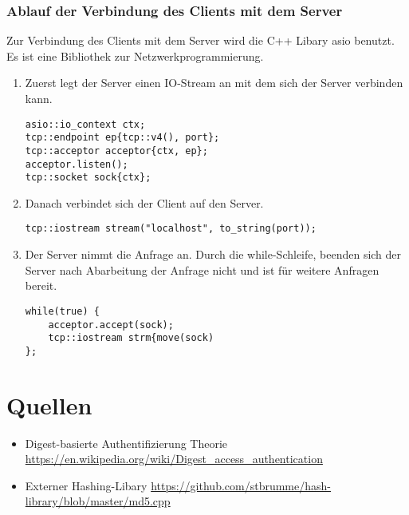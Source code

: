 \documentclass[12pt]{report}
\begin{document}
\subsection{Ablauf der Verbindung des Clients mit dem Server}
Zur Verbindung des Clients mit dem Server wird die C++ Libary asio benutzt. Es ist eine Bibliothek zur Netzwerkprogrammierung.
\begin{enumerate}
    \item Zuerst legt der Server einen IO-Stream an mit dem sich der Server verbinden kann.
    \begin{verbatim}
asio::io_context ctx;
tcp::endpoint ep{tcp::v4(), port};
tcp::acceptor acceptor{ctx, ep}; 
acceptor.listen();
tcp::socket sock{ctx};
    \end{verbatim}
    \item Danach verbindet sich der Client auf den Server.
    \begin{verbatim}
tcp::iostream stream("localhost", to_string(port));
    \end{verbatim}
    \item Der Server nimmt die Anfrage an. Durch die while-Schleife, beenden sich der Server nach Abarbeitung der Anfrage nicht und ist für weitere Anfragen bereit.
    \begin{verbatim}
while(true) {
    acceptor.accept(sock);
    tcp::iostream strm{move(sock)
};
    \end{verbatim}
\end{enumerate}
\newpage
\chapter{Quellen}
\begin{itemize}
    \item Digest-basierte Authentifizierung Theorie 
    \url{https://en.wikipedia.org/wiki/Digest\_access\_authentication}
    \item Externer Hashing-Libary 
    \url{https://github.com/stbrumme/hash-library/blob/master/md5.cpp}
\end{itemize}
\end{document}
